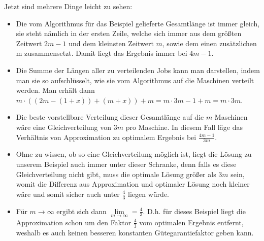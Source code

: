 \documentclass[a4paper]{article}
\begin{document}
Jetzt sind mehrere Dinge leicht zu sehen:
\begin{itemize}
\item Die vom Algorithmus für das Beispiel gelieferte Gesamtlänge ist immer gleich, sie steht nämlich in der ersten Zeile, welche sich immer aus dem größten Zeitwert $2m-1$ und dem kleinsten Zeitwert $m$, sowie dem einen zusätzlichen m zusammensetzt. Damit liegt das Ergebnis immer bei $4m-1$.

\item Die Summe der Längen aller zu verteilenden Jobs kann man darstellen, indem man sie so aufschlüsselt, wie sie vom Algorithmus auf die Maschinen verteilt werden. Man erhält dann $m \cdot ((2m-(1 + x)) + (m + x)) + m = m \cdot 3m-1 + m = m \cdot 3m$.

\item Die beste vorstellbare Verteilung dieser Gesamtlänge auf die $m$ Maschinen wäre eine Gleichverteilung von $3m$ pro Maschine. In diesem Fall läge das Verhältnis von Approximation zu optimalem Ergebnis bei $\frac{4m -1}{3m}$. 

\item Ohne zu wissen, ob so eine Gleichverteilung möglich ist, liegt die Lösung zu unserem Beispiel auch immer unter dieser Schranke, denn falls es diese Gleichverteilung nicht gibt, muss die optimale Lösung größer als $3m$ sein, womit die Differenz aus Approximation und optimaler Lösung noch kleiner wäre und somit sicher auch unter $\frac{4}{3}$ liegen würde.

\item Für $m \rightarrow \infty$ ergibt sich dann $\lim\limits_{m \rightarrow \infty} = \frac{4}{3}$. D.h. für dieses Beispiel liegt die Approximation schon um den Faktor $\frac{4}{3}$ vom optimalen Ergebnis entfernt, weshalb es auch keinen besseren konstanten Gütegarantiefaktor geben kann.

\end{itemize}
\end{document}
